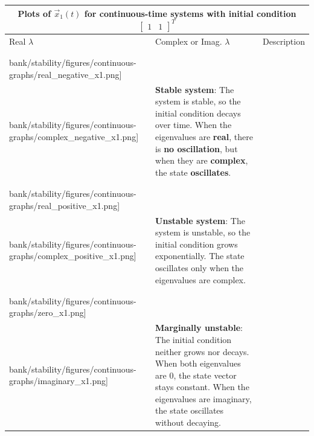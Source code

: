 \begin{tabular}{|m{}|m{}|m{}|}
     \multicolumn{3}{c}{Plots of $\vec{x}_1(t)$ for continuous-time systems with initial condition $\begin{bmatrix} 1 & 1 \end{bmatrix}^T$} \\
    \hline
    Real $\lambda$ & Complex or Imag. $\lambda$ & Description \\
    \hline & & \\
    \texttt{[image: \\bank/stability/figures/continuous-graphs/real\_negative\_x1.png]} &
    \texttt{[image: \\bank/stability/figures/continuous-graphs/complex\_negative\_x1.png]} &
    \textbf{Stable system}: The system is stable, so the initial condition decays over time. When the eigenvalues are \textbf{real}, there is \textbf{no oscillation}, but when they are \textbf{complex}, the state \textbf{oscillates}. \vspace{2mm}\\
    \hline & & \\
    \texttt{[image: \\bank/stability/figures/continuous-graphs/real\_positive\_x1.png]} &
    \texttt{[image: \\bank/stability/figures/continuous-graphs/complex\_positive\_x1.png]} &
    \textbf{Unstable system}: The system is unstable, so the initial condition grows exponentially. The state oscillates only when the eigenvalues are complex. \\
    \hline & & \\
    \texttt{[image: \\bank/stability/figures/continuous-graphs/zero\_x1.png]} &
    \texttt{[image: \\bank/stability/figures/continuous-graphs/imaginary\_x1.png]} &
    \textbf{Marginally unstable}: The initial condition neither grows nor decays. When both eigenvalues are 0, the state vector stays constant. When the eigenvalues are imaginary, the state oscillates without decaying.\\
    \hline
\end{tabular}


